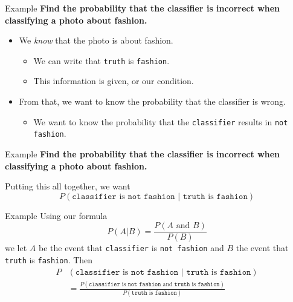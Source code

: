 \begin{frame}{Example}
    \textbf{Find the probability that the classifier is incorrect when classifying a photo about fashion.}
    \begin{itemize}
        \item We \textit{know} that the photo is about fashion.
        \begin{itemize}
            \item We can write that \texttt{truth} is \texttt{fashion}.
            \item This information is given, or our condition.
        \end{itemize}
        \item From that, we want to know the probability that the classifier is wrong.
        \begin{itemize}
            \item We want to know the probability that the \texttt{classifier} results in \texttt{not fashion}.
        \end{itemize}
    \end{itemize}
\end{frame}

\begin{frame}{Example}
    \textbf{Find the probability that the classifier is incorrect when classifying a photo about fashion.}
    
    \vspace{12pt}Putting this all together, we want
        \[
        P(\texttt{classifier} \text{ is } \texttt{not fashion } | \texttt{ truth} \text{ is } \texttt{fashion})
        \]
\end{frame}

\begin{frame}{Example}
    Using our formula
    \[
    P(A|B)=\frac{P(A \text{ and }B)}{P(B)}
    \]
    we let $A$ be the event that \texttt{classifier} is \texttt{not fashion} and $B$ the event that \texttt{truth} is \texttt{fashion}. Then
    \begin{align*}
    P&(\texttt{classifier} \text{ is } \texttt{not fashion } | \texttt{ truth} \text{ is } \texttt{fashion}) \\
    &= \frac{P(\texttt{classifier} \text{ is } \texttt{not fashion } \text{and} \texttt{ truth} \text{ is } \texttt{fashion})}{P(\texttt{truth} \text{ is } \texttt{fashion})}
    \end{align*}
\end{frame}


